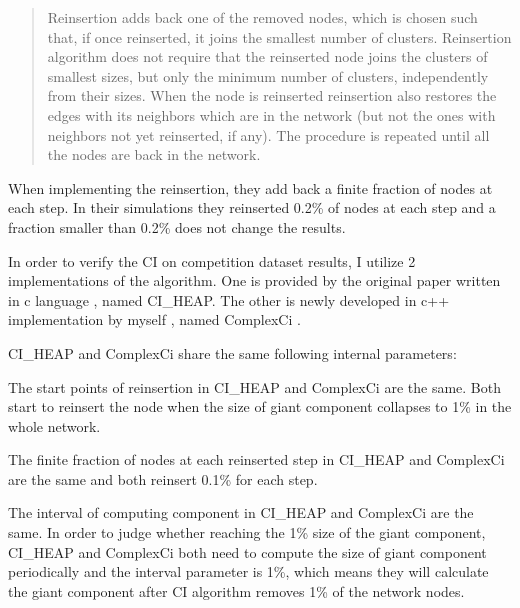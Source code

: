 \documentclass{article}
\newenvironment{itquote}
{\begin{quote}\itshape}
	{\end{quote}\ignorespacesafterend}
\begin{document}
	\begin{itquote}
	
		Reinsertion adds back one of the removed nodes, which is chosen such that, if once reinserted, it joins the smallest number of clusters. Reinsertion algorithm does not require that the reinserted node joins the clusters of smallest sizes, but only the minimum number of clusters, independently from their sizes. When the node is reinserted reinsertion also restores the edges with its neighbors which are in the network (but not the ones with neighbors not yet reinserted, if any). The procedure is repeated until all the nodes are back in the network. 
	
	\end{itquote}
	
	When implementing the reinsertion, they add back a finite fraction of nodes at each step. In their simulations they reinserted 0.2\% of nodes at each step and a fraction smaller than 0.2\% does not change the results.
	
	In order to verify the CI on competition dataset results, I utilize 2 implementations of the algorithm. One is provided by the original paper written in c language \cite{ciheapccode}, named CI\_HEAP. The other is newly developed in c++ implementation by myself \cite{zhfkt2017887989} \cite{zhfktgithub}, named ComplexCi . 
	
	CI\_HEAP and ComplexCi share the same following internal parameters:
	
	
		\begin{enumerate}
		\begin{item}
			The start points of reinsertion in CI\_HEAP and ComplexCi are the same. Both start to reinsert the node when the size of giant component collapses to 1\% in the whole network.
		\end{item}
		\begin{item}
			The finite fraction of nodes at each reinserted step in CI\_HEAP and ComplexCi are the same and both reinsert 0.1\% for each step.
		\end{item}
		\begin{item}
			The interval of computing component in CI\_HEAP and ComplexCi are the same. In order to judge whether reaching the 1\% size of the giant component, CI\_HEAP and ComplexCi both need to compute the size of giant component periodically and the interval parameter is 1\%, which means they will calculate the giant component after CI algorithm removes 1\% of the network nodes.
		\end{item}	
	\end{enumerate}	
	
\end{document}
